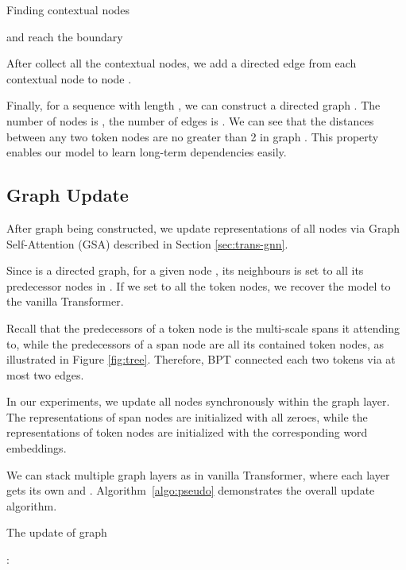 \documentclass[11pt,a4paper]{article}
\begin{document}
\begin{algorithm}[!ht]
\begin{algorithmic}
\caption{Finding contextual nodes}
\label{algo:topdown}
\State 
\Repeat
{}
\State 
\State 

\State 

\EndFor
\State 
\State 
\Until  and  reach the boundary
\State \Return 
\EndFunction
\end{algorithmic}
\end{algorithm}

After collect all the contextual nodes, we add a directed edge from each contextual node to node .

Finally, for a sequence with length ,
we can construct a directed graph . The number of nodes is , the number of edges is .
We can see that the distances between any two token nodes are no greater than 2 in graph .
This property enables our model to learn long-term dependencies easily. 

\subsection{Graph Update}


After graph  being constructed, we update representations of all nodes via Graph Self-Attention (GSA) described in Section \ref{sec:trans-gnn}.

Since  is a directed graph, for a given node , its neighbours  is set to all its predecessor nodes in .
If we set   to all the token nodes, we recover the model to the vanilla Transformer.

Recall that the predecessors of a token node is the multi-scale spans it attending to, while the predecessors of a span node are all its contained token nodes, as illustrated in Figure \ref{fig:tree}.
Therefore, BPT connected each two tokens via at most two edges.

In our experiments, we update all nodes synchronously within the graph layer.
The representations of span nodes are initialized with all zeroes, while the representations of token nodes are initialized with the corresponding word embeddings.



We can stack multiple graph layers as in vanilla Transformer, where each layer gets its own  and .
Algorithm~\ref{algo:pseudo} demonstrates the overall update algorithm.

\begin{algorithm}[!htb]
\caption{The update of graph}
\label{algo:pseudo}
\begin{algorithmic}[1]
:
\State 
\State 
\EndFor
\State \Return 
\end{algorithmic}
\end{algorithm}
\end{document}

